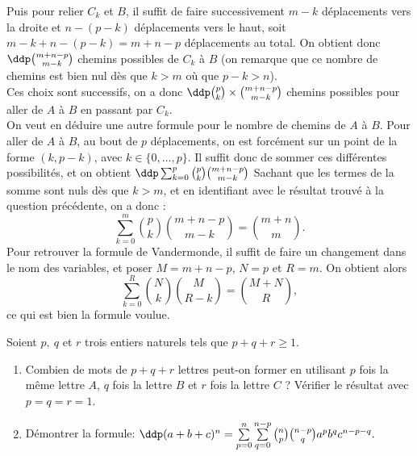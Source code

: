 \documentclass[a4paper, 11pt]{article}
\begin{document}
\begin{correction}
\begin{enumerate}
\begin{enumerate}
			            Puis pour relier $C_k$ et $B$, il suffit de faire successivement $m-k$ d\'eplacements vers la droite et $n-(p-k)$ d\'eplacements vers le haut, soit $m-k+n-(p-k)=m+n-p$ d\'eplacements au total. On obtient donc $\ddp \binom{m+n-p}{m-k}$ chemins possibles de $C_k$ \`a $B$ (on remarque que ce nombre de chemins est bien nul d\`es que $k>m$ o\`u que $p-k>n$).\\
			            Ces choix sont successifs, on a donc $\ddp \binom{p}{k} \times \binom{m+n-p}{m-k}$ chemins possibles pour aller de $A$ \`a $B$ en passant par $C_k$.\\
			            On veut en d\'eduire une autre formule pour le nombre de chemins de $A$ \`a $B$. Pour aller de $A$ \`a $B$, au bout de $p$ d\'eplacements, on est forc\'ement sur un point de la forme $(k, p-k)$, avec $k\in \{0, \ldots, p\}$. Il suffit donc de sommer ces diff\'erentes possibilit\'es, et on obtient $\ddp \sum_{k=0}^p \binom{p}{k} \binom{m+n-p}{m-k}$ Sachant que les termes de la somme sont nuls d\`es que $k>m$, et en identifiant avec le r\'esultat trouv\'e \`a la question pr\'ec\'edente, on a donc :
			            $$\sum_{k=0}^m \binom{p}{k} \binom{m+n-p}{m-k} = \binom{m+n}{m}.$$
			            Pour retrouver la formule de Vandermonde, il suffit de faire un changement dans le nom des variables, et poser $M=m+n-p$, $N=p$ et $R=m$. On obtient alors
			            $$\sum_{k=0}^R \binom{N}{k} \binom{M}{R-k} = \binom{M+N}{R},$$
			            ce qui est bien la formule voulue.
		      \end{enumerate}
	\end{enumerate}
\end{correction}
\begin{exercice}  \;
	Soient $p,\ q$ et $r$ trois entiers naturels tels que $p+q+r\geq 1$.
	\begin{enumerate}
		\item Combien de mots de $p+q+r$ lettres peut-on former en utilisant $p$ fois la m\^eme lettre $A$, $q$ fois la lettre $B$ et $r$ fois la lettre $C$ ?
		      V\'erifier le r\'esultat avec $p=q=r=1$.
		\item D\'emontrer la formule: $\ddp (a+b+c)^n=\sum\limits_{p=0}^{n}\sum\limits_{q=0}^{n-p}\binom{n}{p}\binom{n-p}{q}a^p b^q c^{n-p-q}.$
	\end{enumerate}
\end{exercice}
\end{document}
